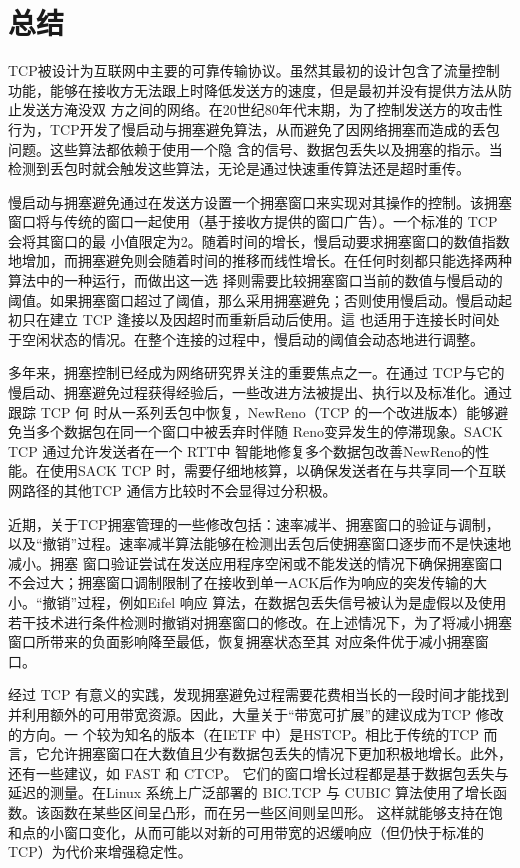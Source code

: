\section{总结}
TCP被设计为互联网中主要的可靠传输协议。虽然其最初的设计包含了流量控制功能，能够在接收方无法跟上时降低发送方的速度，但是最初并没有提供方法从防止发送方淹没双
方之间的网络。在20世纪80年代末期，为了控制发送方的攻击性行为，TCP开发了慢启动与拥塞避免算法，从而避免了因网络拥塞而造成的丢包问题。这些算法都依赖于使用一个隐
含的信号、数据包丢失以及拥塞的指示。当检测到丢包时就会触发这些算法，无论是通过快速重传算法还是超时重传。

慢启动与拥塞避免通过在发送方设置一个拥塞窗口来实现对其操作的控制。该拥塞窗口将与传统的窗口一起使用（基于接收方提供的窗口广告）。一个标准的 TCP 会将其窗口的最
小值限定为2。随着时间的增长，慢启动要求拥塞窗口的数值指数地增加，而拥塞避免则会随着时间的推移而线性增长。在任何时刻都只能选择两种算法中的一种运行，而做出这一选
择则需要比较拥塞窗口当前的数值与慢启动的阈值。如果拥塞窗口超过了阈值，那么采用拥塞避免；否则使用慢启动。慢启动起初只在建立 TCP 逢接以及因超时而重新启动后使用。這
也适用于连接长时间处于空闲状态的情况。在整个连接的过程中，慢启动的阈值会动态地进行调整。

多年来，拥塞控制已经成为网络研究界关注的重要焦点之一。在通过 TCP与它的慢启动、拥塞避免过程获得经验后，一些改进方法被提出、执行以及标准化。通过跟踪 TCP 何
时从一系列丢包中恢复，NewReno（TCP 的一个改进版本）能够避免当多个数据包在同一个窗口中被丢弃时伴随 Reno变异发生的停滞现象。SACK TCP 通过允许发送者在一个 RTT中
智能地修复多个数据包改善NewReno的性能。在使用SACK TCP 时，需要仔细地核算，以确保发送者在与共享同一个互联网路径的其他TCP 通信方比较时不会显得过分积极。

近期，关于TCP拥塞管理的一些修改包括：速率减半、拥塞窗口的验证与调制，以及“撤销”过程。速率减半算法能够在检测出丢包后使拥塞窗口逐步而不是快速地减小。拥塞
窗口验证尝试在发送应用程序空闲或不能发送的情况下确保拥塞窗口不会过大；拥塞窗口调制限制了在接收到单一ACK后作为响应的突发传输的大小。“撤销”过程，例如Eifel 响应
算法，在数据包丢失信号被认为是虚假以及使用若干技术进行条件检测时撤销对拥塞窗口的修改。在上述情况下，为了将减小拥塞窗口所带来的负面影响降至最低，恢复拥塞状态至其
对应条件优于减小拥塞窗口。

经过 TCP 有意义的实践，发现拥塞避免过程需要花费相当长的一段时间才能找到并利用额外的可用带宽资源。因此，大量关于“带宽可扩展”的建议成为TCP 修改的方向。一
个较为知名的版本（在IETF 中）是HSTCP。相比于传统的TCP 而言，它允许拥塞窗口在大数值且少有数据包丢失的情况下更加积极地增长。此外，还有一些建议，如 FAST 和 CTCP。
它们的窗口增长过程都是基于数据包丢失与延迟的测量。在Linux 系统上广泛部署的 BIC.TCP 与 CUBIC 算法使用了增长函数。该函数在某些区间呈凸形，而在另一些区间则呈凹形。
这样就能够支持在饱和点的小窗口变化，从而可能以对新的可用带宽的迟缓响应（但仍快于标准的 TCP）为代价来增强稳定性。

